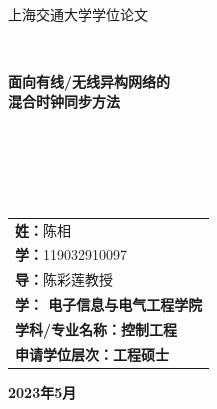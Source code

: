 \documentclass[UTF8,a4paper,12pt]{ctexart}
\numberwithin{equation}{section}
\begin{document}
\thispagestyle{empty}

\renewcommand{\headrulewidth}{0pt}
\begin{figure}[htb] 
 \end{figure}

\begin{center}
\songti {} 上海交通大学学位论文
\end{center}
~\\
\begin{center}
\songti {} \textbf{面向有线/无线异构网络的\\混合时钟同步方法}
\end{center}
~\\
~\\
~\\
~\\
\begin{center}
\heiti {}
\begin{tabular}{l}
\textbf{姓：}陈相\\ 
\textbf{学：}119032910097\\
\textbf{导：}陈彩莲教授\\
\textbf{学： 电子信息与电气工程学院}\\
\textbf{学科/专业名称：控制工程}\\
\textbf{申请学位层次：工程硕士}\\
\end{tabular}
\end{center}
\vfill
\vspace{1em}

\begin{center}
\songti {} \textbf{2023年5月}
\end{center}
\end{document}

